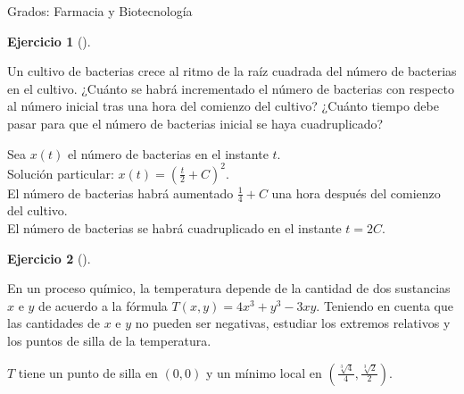 \documentclass[
  a4paper,
]{scrreport}
\theoremstyle{definition}
\newtheorem{exercise}{Ejercicio}[chapter]
\theoremstyle{remark}
\begin{document}
Grados: Farmacia y Biotecnología

\begin{exercise}[]\protect\hypertarget{exr-1}{}\label{exr-1}

Un cultivo de bacterias crece al ritmo de la raíz cuadrada del número de
bacterias en el cultivo. ¿Cuánto se habrá incrementado el número de
bacterias con respecto al número inicial tras una hora del comienzo del
cultivo? ¿Cuánto tiempo debe pasar para que el número de bacterias
inicial se haya cuadruplicado?

\end{exercise}

\begin{tcolorbox}[enhanced jigsaw, opacitybacktitle=0.6, titlerule=0mm, bottomtitle=1mm, toptitle=1mm, breakable, bottomrule=.15mm, left=2mm, opacityback=0, toprule=.15mm, leftrule=.75mm, colframe=quarto-callout-tip-color-frame, coltitle=black, rightrule=.15mm, colback=white, title=\textcolor{quarto-callout-tip-color}{\faLightbulb}\hspace{0.5em}{Solución}, arc=.35mm, colbacktitle=quarto-callout-tip-color!10!white]

Sea \(x(t)\) el número de bacterias en el instante \(t\).\\
Solución particular: \(x(t)=\left(\frac{t}{2}+C\right)^2\).\\
El número de bacterias habrá aumentado \(\frac{1}{4}+C\) una hora
después del comienzo del cultivo.\\
El número de bacterias se habrá cuadruplicado en el instante \(t=2C\).

\end{tcolorbox}

\begin{exercise}[]\protect\hypertarget{exr-2}{}\label{exr-2}

En un proceso químico, la temperatura depende de la cantidad de dos
sustancias \(x\) e \(y\) de acuerdo a la fórmula
\(T(x,y)=4x^3+y^3-3xy\). Teniendo en cuenta que las cantidades de \(x\)
e \(y\) no pueden ser negativas, estudiar los extremos relativos y los
puntos de silla de la temperatura.

\end{exercise}

\begin{tcolorbox}[enhanced jigsaw, opacitybacktitle=0.6, titlerule=0mm, bottomtitle=1mm, toptitle=1mm, breakable, bottomrule=.15mm, left=2mm, opacityback=0, toprule=.15mm, leftrule=.75mm, colframe=quarto-callout-tip-color-frame, coltitle=black, rightrule=.15mm, colback=white, title=\textcolor{quarto-callout-tip-color}{\faLightbulb}\hspace{0.5em}{Solución}, arc=.35mm, colbacktitle=quarto-callout-tip-color!10!white]

\(T\) tiene un punto de silla en \((0,0)\) y un mínimo local en
\(\left(\frac{\sqrt[3]{4}}{4},\frac{\sqrt[3]{2}}{2}\right)\).

\end{tcolorbox}
\end{document}
